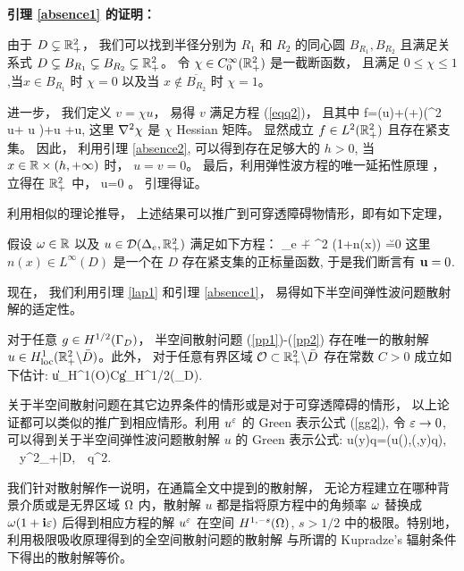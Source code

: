 \finproof



{\noindent \bf 引理 \ref{absence1} 的证明：} 

由于 $D\subsetneq\mathbb{R}^2_+$， 我们可以找到半径分别为 $R_1$ 和 $R_2$ 的同心圆 $B_{R_1},B_{R_2}$ 且满足关系式 $D\subsetneq B_{R_1}\subsetneq B_{R_2}  \subsetneq \mathbb{R}^2_+$。 令 $\chi \in C_{0}^{\infty}(\mathbb{R}^2_+)$ 是一截断函数， 且满足 $0 \leq \chi \leq 1$,当$x\in B_{R_1}$ 时 $\chi=0$  以及当 $x\notin \overline{B_{R_2}}$ 时 $\chi=1$。

进一步， 我们定义 $v=\chi u$，
易得 $v$ 满足方程 (\ref{eqq2})， 且其中
\ben
f=\sigma(u)\na\chi+(\lambda+\mu)(\na^2 \chi u+ \na u \na\chi)+\mu\Delta\chi u +\mu\div u\na\chi,
\een
 这里 $\nabla^2 \chi$ 是 $\chi$ Hessian 矩阵。 显然成立 $f\in L^2(\mathbb{R}^2_+)$ 且存在紧支集。 因此， 利用引理 \ref{absence2}, 可以得到存在足够大的 $h>0$, 当 $x\in \mathbb{R}\times(h,+\infty)$ 时， $u=v=0$。 最后，利用弹性波方程的唯一延拓性原理 \cite{Morassi2001STRONG}，
立得在 $\mathbb{R}^2_+$ 中， u=0 。 引理得证。
\finproof

利用相似的理论推导， 上述结果可以推广到可穿透障碍物情形，即有如下定理，
\begin{lem}
	假设 $\omega\in \mathbb{R}$ 以及 $u\in \mathcal{D}(\Delta_e,\mathbb{R}^2_+)$ 满足如下方程： 
	\ben
	\De_e \u + \om^2 (1+n(x)) \u =0
	\een
	这里 $n(x)\in L^{\infty}(D)$ 是一个在 $D$ 存在紧支集的正标量函数,
	于是我们断言有 $\mathbf{u}=0$.
\end{lem}


现在， 我们利用引理 \ref{lap1} 和引理 \ref{absence1}， 易得如下半空间弹性波问题散射解的适定性。
\begin{thm} \label{thm:4.1}\label{lap2}
	对于任意 $g \in H^{1/2}(\Gamma_D)$， 半空间散射问题 (\ref{pp1})-(\ref{pp2})
	存在唯一的散射解 $u\in H^{1}_{\rm loc}(\mathbb{R}^2_+ \backslash \bar D)$。此外， 对于任意有界区域 $\mathcal O\subset \mathbb{R}^2_+\backslash\bar D$ 存在常数 $C>0$ 成立如下估计:
	\ben
	\|u\|_{H^{1}(\mathcal O)}\le C\|g\|_{H^{1/2}(\Ga_D)}.
	\een
\end{thm}

关于半空间散射问题在其它边界条件的情形或是对于可穿透障碍的情形， 以上论证都可以类似的推广到相应情形。利用 $u^\varepsilon$ 的 Green 表示公式 (\ref{gg2}), 令 $\varepsilon\to 0$, 可以得到关于半空间弹性波问题散射解 $u$ 的 Green 表示公式: 
\be\label{g2}
u(y)\cdot q=\GG(u(\cdot),\N(\cdot,y)q), \ \ \forall y\in\R^2_+\bks\bar D,\ \ \forall q\in\R^2.
\ee
\begin{remark}
	我们针对散射解作一说明，在通篇全文中提到的散射解， 无论方程建立在哪种背景介质或是无界区域 $\Omega
	$ 内，散射解 $u$ 都是指将原方程中的角频率 $\omega$ 替换成 $\omega(1+\mathbf{i}\varepsilon)$ 后得到相应方程的解 $u^\varepsilon$ 在空间 $H^{1,-s}(\Omega)$, $s>1/2$ 中的极限。特别地， 利用极限吸收原理得到的全空间散射问题的散射解 \cite{leis, cxz2016} 与所谓的 Kupradze's 辐射条件下得出的散射解等价。
\end{remark}

